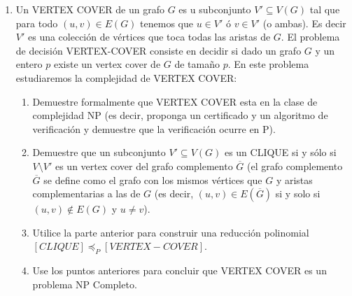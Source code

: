 \documentclass[12pt, a4paper]{article}
\begin{document}
\begin{enumerate}
\item Un VERTEX COVER de un grafo $G$ es u subconjunto $V'\subseteq V(G)$ tal que para todo $(u,v)\in E(G)$ tenemos que $u\in V'$ ó $v\in V'$ (o ambas). Es decir $V'$ es una colección de vértices que toca todas las aristas de $G$. El problema de decisión VERTEX-COVER consiste en decidir si dado un grafo $G$ y un entero $p$ existe un vertex cover de $G$ de tamaño $p$. En este problema estudiaremos la complejidad de VERTEX COVER:
\begin{enumerate}
\item Demuestre formalmente que VERTEX COVER esta en la clase de complejidad NP (es decir, proponga un certificado y un algoritmo de verificación y demuestre que la verificación ocurre en P).
\item Demuestre que un subconjunto $V'\subseteq V(G)$ es un CLIQUE si y sólo si $V\setminus V'$ es un vertex cover del grafo complemento $\overline{G}$ (el grafo complemento $\overline{G}$ se define como el grafo con los mismos vértices que $G$ y aristas complementarias a las de $G$ (es decir, $(u,v)\in E(\overline{G})$ si y solo si $(u,v)\not\in E(G)$ y $u\neq v$).
\item Utilice la parte anterior para construir una reducción polinomial $[CLIQUE]\preceq_P [VERTEX-COVER]$.
\item Use los puntos anteriores para concluir que VERTEX COVER es un problema NP Completo.
\end{enumerate}





\end{enumerate}
\end{document}
